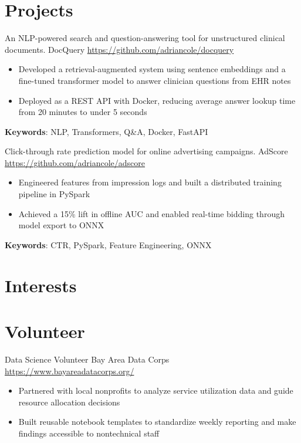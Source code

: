 \documentclass[a4paper, serif, 10pt]{moderncv}
\begin{document}
\section{Projects}

        {An NLP-powered search and question-answering tool for unstructured clinical documents.}
        {DocQuery}
        {\url{https://github.com/adriancole/docquery}}
        {}
        {\begin{itemize}
\item Developed a retrieval-augmented system using sentence embeddings and a fine-tuned transformer model to answer clinician questions from EHR notes
\item Deployed as a REST API with Docker, reducing average answer lookup time from 20 minutes to under 5 seconds
\end{itemize}
\textbf{Keywords}: NLP, Transformers, Q\&A, Docker, FastAPI}

        {Click-through rate prediction model for online advertising campaigns.}
        {AdScore}
        {\url{https://github.com/adriancole/adscore}}
        {}
        {\begin{itemize}
\item Engineered features from impression logs and built a distributed training pipeline in PySpark
\item Achieved a 15\% lift in offline AUC and enabled real-time bidding through model export to ONNX
\end{itemize}
\textbf{Keywords}: CTR, PySpark, Feature Engineering, ONNX}
\section{Interests}

\section{Volunteer}

        {Data Science Volunteer}
        {Bay Area Data Corps}
        {\url{https://www.bayareadatacorps.org/}}
        {}
        {\begin{itemize}
\item Partnered with local nonprofits to analyze service utilization data and guide resource allocation decisions
\item Built reusable notebook templates to standardize weekly reporting and make findings accessible to nontechnical staff
\end{itemize}}
\end{document}
